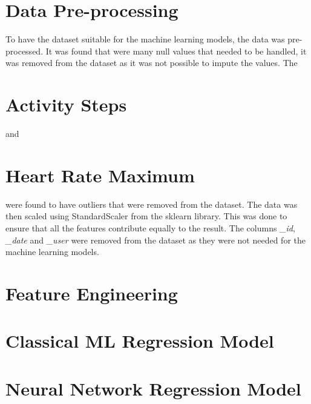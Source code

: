 \section{Data Pre-processing}
To have the dataset suitable for the machine learning models, the data was pre-processed. It was found that were many null values that needed to be handled, 
it was removed from the dataset as it was not possible to impute the values. The \section{Activity Steps} and \section{Heart Rate Maximum} were found to have
outliers that were removed from the dataset. The data was then scaled using StandardScaler from the sklearn library. This was done to ensure that all the features
contribute equally to the result.
The columns \textit{\_id}, \textit{\_date} and \textit{\_user} were removed from the dataset as they were not needed for the machine learning models.






\section{Feature Engineering}





\section{Classical ML Regression Model}








\section{Neural Network Regression Model}



